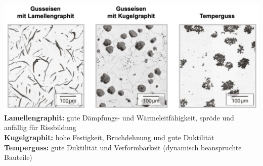 \includegraphics[width =\linewidth]{src/images/Gusseisen.png}\\

\textbf{Lamellengraphit:} gute Dämpfungs- und Wärmeleitfähigkeit, spröde 
und anfällig für Rissbildung\\

\textbf{Kugelgraphit:} hohe Festigkeit, Bruchdehnung und gute Duktilität\\

\textbf{Temperguss:} gute Duktilität und Verformbarkeit (dynamisch beanspruchte Bauteile)\\
